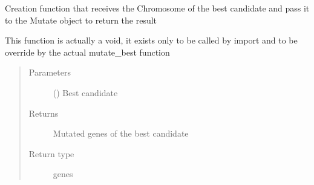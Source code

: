 \documentclass[letterpaper,10pt,english]{sphinxmanual}
\begin{document}
\begin{fulllineitems}
\label{\detokenize{MolOpt.genetic:MolOpt.genetic.genetic.mutate_best}}
\sphinxAtStartPar
Creation function that receives the Chromosome of the best candidate and pass it to the Mutate object to return 
the result

\sphinxAtStartPar
This function is actually a void, it exists only to be called by import and to be override by the actual mutate\_best
function
\begin{quote}\begin{description}
\item[{Parameters}] \leavevmode
\sphinxAtStartPar
{} ({\hyperref[\detokenize{MolOpt.genetic:MolOpt.genetic.genetic.Chromosome}]{}}) \textendash{} Best candidate

\item[{Returns}] \leavevmode
\sphinxAtStartPar
Mutated genes of the best candidate

\item[{Return type}] \leavevmode
\sphinxAtStartPar
genes

\end{description}\end{quote}

\end{fulllineitems}

\end{document}
